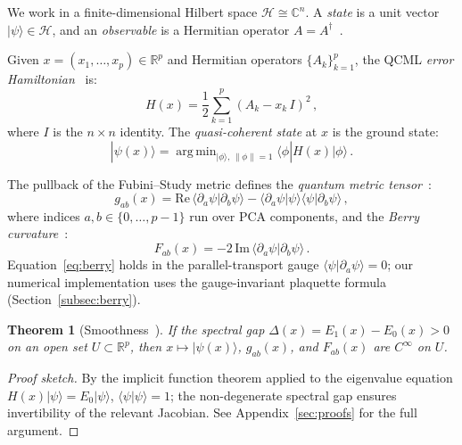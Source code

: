 \documentclass[3p]{elsarticle}
\newtheorem{theorem}{Theorem}
\newcommand{\ket}[1]{|#1\rangle}
\newcommand{\braket}[2]{\langle#1|#2\rangle}
\newcommand{\dbraket}[3]{\langle#1|#2|#3\rangle}
\newcommand{\R}{\mathbb{R}}
\newcommand{\C}{\mathbb{C}}
\newcommand{\calH}{\mathcal{H}}
\DeclareMathOperator*{\argmin}{arg\,min}
\begin{document}
We work in a finite-dimensional Hilbert space $\calH \cong \C^n$.  A
\emph{state} is a unit vector $\ket{\psi} \in \calH$, and an
\emph{observable} is a Hermitian operator
$A = A^\dagger$~\cite{candelori2025,abanov2025}.

Given $x = (x_1, \ldots, x_p) \in \R^p$ and Hermitian operators
$\{A_k\}_{k=1}^p$, the QCML \emph{error
Hamiltonian}~\cite{candelori2025,musaelian2024} is:
\begin{equation}\label{eq:hamiltonian}
  H(x) = \frac{1}{2}\sum_{k=1}^{p} (A_k - x_k\, I)^2\,,
\end{equation}
where $I$ is the $n \times n$ identity.  The \emph{quasi-coherent
state} at $x$ is the ground state:
\begin{equation}\label{eq:ground_state}
  \ket{\psi(x)} = \argmin_{\ket{\phi},\,\|\phi\|=1}
  \dbraket{\phi}{H(x)}{\phi}\,.
\end{equation}

The pullback of the Fubini--Study metric defines the \emph{quantum
metric tensor}~\cite{provost_vallee1980}:
\begin{equation}\label{eq:metric}
  g_{ab}(x) = \mathrm{Re}\,\braket{\partial_a\psi}{\partial_b\psi}
  - \braket{\partial_a\psi}{\psi}\braket{\psi}{\partial_b\psi}\,,
\end{equation}
where indices $a, b \in \{0, \ldots, p-1\}$ run over PCA components,
and the \emph{Berry curvature}~\cite{berry1984,abanov2025}:
\begin{equation}\label{eq:berry}
  F_{ab}(x) = -2\,\mathrm{Im}\,\braket{\partial_a\psi}{\partial_b\psi}\,.
\end{equation}
Equation~\eqref{eq:berry} holds in the parallel-transport gauge
$\braket{\psi}{\partial_a\psi} = 0$; our numerical implementation uses
the gauge-invariant plaquette formula (Section~\ref{subsec:berry}).

\begin{theorem}[Smoothness~\cite{candelori2025}]\label{thm:smoothness}
If the spectral gap $\Delta(x) = E_1(x) - E_0(x) > 0$ on an open set
$U \subset \R^p$, then $x \mapsto \ket{\psi(x)}$, $g_{ab}(x)$, and
$F_{ab}(x)$ are $C^\infty$ on $U$.
\end{theorem}
\begin{proof}[Proof sketch]
By the implicit function theorem applied to the eigenvalue equation
$H(x)\ket{\psi} = E_0\ket{\psi}$, $\braket{\psi}{\psi} = 1$;
the non-degenerate spectral gap ensures invertibility of the
relevant Jacobian.  See Appendix~\ref{sec:proofs} for the full argument.
\end{proof}
\end{document}
